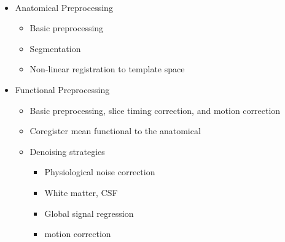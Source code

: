 \\
\begin{itemize}
    \item Anatomical Preprocessing
    \begin{itemize}
        \item Basic preprocessing
        \item Segmentation
        \item Non-linear registration to template space
    \end{itemize}
    \item Functional Preprocessing
    \begin{itemize}
        \item Basic preprocessing, slice timing correction, and motion correction
        \item Coregister mean functional to the anatomical
        \item Denoising strategies
        \begin{itemize}
            \item Physiological noise correction
            \item White matter, CSF
            \item Global signal regression
            \item motion correction
        \end{itemize}
    \end{itemize}
\end{itemize}

